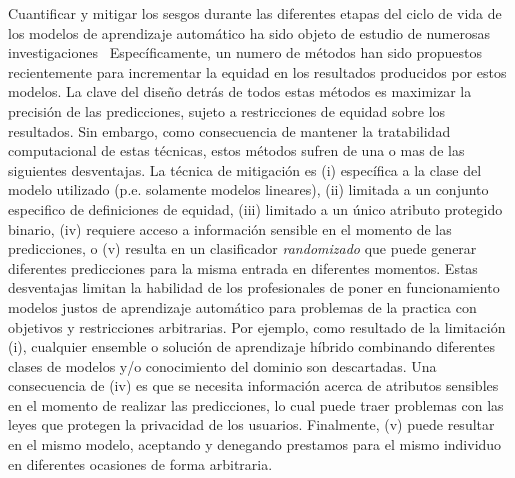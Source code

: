
Cuantificar y mitigar los sesgos durante las diferentes etapas del ciclo de vida de los modelos de aprendizaje automático ha sido objeto de estudio de numerosas investigaciones~
Específicamente, un numero de métodos han sido propuestos recientemente para incrementar la equidad en los resultados producidos por estos modelos.
La clave del diseño detrás de todos estas métodos es maximizar la precisión de las predicciones, sujeto a restricciones de equidad sobre los resultados.
Sin embargo, como consecuencia de mantener la tratabilidad computacional de estas técnicas, estos métodos sufren de una o mas de las siguientes desventajas.
La técnica de mitigación es
(i) específica a la clase del modelo utilizado (p.e. solamente modelos lineares),
(ii) limitada a un conjunto especifico de definiciones de equidad,
(iii) limitado a un único atributo protegido binario,
(iv) requiere acceso a información sensible en el momento de las predicciones, o
(v) resulta en un clasificador \emph{randomizado} que puede generar diferentes predicciones para la misma entrada en diferentes momentos.
Estas desventajas limitan la habilidad de los profesionales de poner en funcionamiento modelos justos de aprendizaje automático para problemas de la practica con objetivos y restricciones arbitrarias.
Por ejemplo, como resultado de la limitación (i), cualquier ensemble o solución de aprendizaje híbrido combinando diferentes clases de modelos y/o conocimiento del dominio son descartadas.
Una consecuencia de (iv) es que se necesita información acerca de atributos sensibles en el momento de realizar las predicciones, lo cual puede traer problemas con las leyes que protegen la privacidad de los usuarios.
Finalmente, (v) puede resultar en el mismo modelo, aceptando y denegando prestamos para el mismo individuo en diferentes ocasiones de forma arbitraria.


